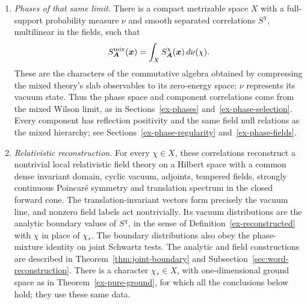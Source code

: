 \begin{theorem}
\begin{enumerate}
\item \emph{Phases of that same limit.}
There is a compact metrizable space $X$ with a full-support probability
measure $\nu$ and smooth separated correlations $S^\chi$, multilinear in
the fields, such that
\[
 S^{\rm mix}_{\boldsymbol A}(\boldsymbol x)
   =\int_X S^\chi_{\boldsymbol A}(\boldsymbol x)\,d\nu(\chi).
\]
These are the characters of the commutative algebra obtained by compressing
the mixed theory's slab observables to its zero-energy space; $\nu$
represents its vacuum state. Thus the phase space and component correlations
come from the mixed Wilson limit, as in Sections~\ref{ex-phases}
and~\ref{ex-phase-selection}. Every component has reflection positivity
and the same field null relations as the mixed hierarchy; see
Sections~\ref{ex-phase-regularity} and~\ref{ex-phase-fields}.

\item \emph{Relativistic reconstruction.}
For every $\chi\in X$, these correlations reconstruct a nontrivial local
relativistic field theory on a Hilbert space with a common dense invariant
domain, cyclic vacuum, adjoints, tempered fields, strongly continuous
Poincar\'e symmetry and translation spectrum in the closed forward cone.
The translation-invariant vectors form precisely the vacuum line, and
nonzero field labels act nontrivially. Its vacuum distributions are the
analytic boundary values of $S^\chi$, in the sense of
Definition~\ref{ex-reconstructed} with $\chi$ in place of $\chi_*$.
The boundary distributions also obey the phase-mixture identity on joint
Schwartz tests. The analytic and field constructions are described in
Theorem~\ref{thm:joint-boundary} and Subsection~\ref{sec:word-reconstruction}.
There is a character $\chi_*\in X$, with one-dimensional ground space
as in Theorem~\ref{ex-pure-ground}, for which all the conclusions below
hold; they use these same data.


\end{enumerate}
\end{theorem}
